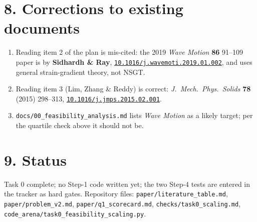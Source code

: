 \documentclass[11pt]{article}
\newcommand{\doi}[1]{\href{https://doi.org/#1}{\texttt{#1}}}
\begin{document}
\section*{8. Corrections to existing documents}
\begin{enumerate}\small
\item Reading item 2 of the plan is mis-cited: the 2019 \emph{Wave Motion} \textbf{86} 91--109 paper
is by \textbf{Sidhardh \& Ray}, \doi{10.1016/j.wavemoti.2019.01.002}, and uses general strain-gradient
theory, not NSGT.
\item Reading item 3 (Lim, Zhang \& Reddy) is correct: \emph{J.\ Mech.\ Phys.\ Solids}
\textbf{78} (2015) 298--313, \doi{10.1016/j.jmps.2015.02.001}.
\item \texttt{docs/00\_feasibility\_analysis.md} lists \emph{Wave Motion} as a likely target; per the
quartile check above it should not be.
\end{enumerate}

\section*{9. Status}
Task 0 complete; no Step-1 code written yet; the two Step-4 tests are entered in the tracker as
hard gates. Repository files: \texttt{paper/literature\_table.md},
\texttt{paper/problem\_v2.md}, \texttt{paper/q1\_scorecard.md},
\texttt{checks/task0\_scaling.md}, \texttt{code\_arena/task0\_feasibility\_scaling.py}.
\end{document}
